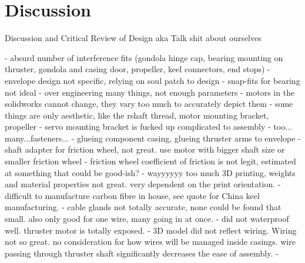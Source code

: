 \documentclass[../main.tex]{subfiles}
\begin{document}
\chapter{Discussion}

Discussion and Critical Review of Design aka Talk shit about ourselves

- absurd number of interference fits (gondola hinge cap, bearing mounting on thruster, gondola and casing door, propeller, keel connectors, end stops)
- envelope design not specific, relying on soul patch to design
- snap-fits for bearing not ideal
- over engineering many things, not enough parameters
-  motors in the solidworks cannot change, they vary too much to accurately depict them
- some things are only aesthetic, like the rshaft thread, motor mounting bracket, propeller
- servo mounting bracket is fucked up complicated to assembly
- too... many...fasteners...
- glueing component casing, glueing thruster arms to envelope
- shaft adapter for friction wheel, not great. use motor with bigger shaft size or smaller friction wheel
- friction wheel coefficient of friction is not legit, estimated at something that could be good-ish?
- wayyyyyy too much 3D printing, weights and material properties not great. very dependent on the print orientation.
- difficult to manufacture carbon fibre in house, see quote for China keel manufacturing.
- cable glands not totally accurate, none could be found that small. also only good for one wire, many going in at once.
- did not waterproof well. thruster motor is totally exposed.
- 3D model did not reflect wiring. Wiring not so great. no consideration for how wires will be managed inside casings. wire passing through thruster shaft significantly decreases the ease of assembly.
- 
\end{document}
